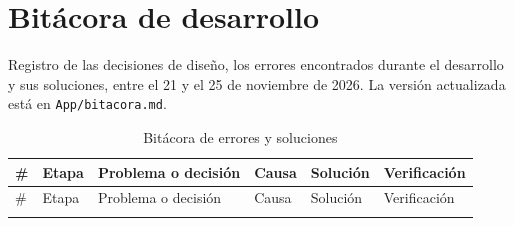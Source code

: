 \section{Bitácora de desarrollo}
\label{app:bitacora}

Registro de las decisiones de diseño, los errores encontrados durante el desarrollo y sus soluciones, entre el 21 y el 25 de noviembre de 2026. La versión actualizada está en \texttt{App/bitacora.md}.

{\scriptsize
\setlength{\tabcolsep}{3pt}
\begin{longtable}{@{}p{0.5cm}p{1.6cm}p{3.3cm}p{3.1cm}p{3.6cm}p{2.4cm}@{}}
\caption{Bitácora de errores y soluciones}\label{tab:bitacora}\\
\toprule
\# & Etapa & Problema o decisión & Causa & Solución & Verificación \\
\midrule
\endfirsthead
\toprule
\# & Etapa & Problema o decisión & Causa & Solución & Verificación \\
\midrule
\endhead
\endfoot

\end{longtable}
}
